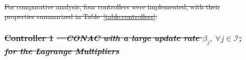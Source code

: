 \documentclass[letterpaper, journal]{IEEEtran}
\providecommand{\DIFdel}[1]{{\protect\color{red}\sout{#1}}} %
\providecommand{\DIFdelbegin}{} %
\begin{document}
\DIFdelbegin %

\DIFdel{For comparative analysis, four controllers were implemented, with their properties summarized in Table~\ref{table:controllers}.
}%

\subsubsection*{\DIFdel{Controller 1 }%
\DIFdel{—}\textit{\DIFdel{CONAC with a large update rate $\beta_j,\ \forall j\in\mathcal{I}$, for the Lagrange Multipliers}}%
}
\end{document}

